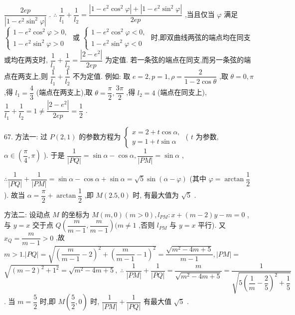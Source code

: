 $\dfrac{2ep}{\left| 1 - {e}^{2}{\sin }^{2}\varphi \right| }$ . $\therefore \;\dfrac{1}{{l}_{1}} + \dfrac{1}{{l}_{2}} = \dfrac{\left| {1 - {e}^{2}{\cos }^{2}\varphi }\right|  + \left| {1 - {e}^{2}{\sin }^{2}\varphi }\right| }{2ep}$ ,当且仅当 $\varphi$ 满足 $\left\{  \begin{array}{l} 1 - {e}^{2}{\cos }^{2}\varphi  > 0, \\  1 - {e}^{2}{\sin }^{2}\varphi  > 0 \end{array}\right.$ 或 $\left\{  \begin{array}{l} 1 - {e}^{2}{\cos }^{2}\varphi  < 0, \\  1 - {e}^{2}{\sin }^{2}\varphi  < 0 \end{array}\right.$ 时,即双曲线两弦的端点均在同支或均在两支时, $\dfrac{1}{{l}_{1}} + \dfrac{1}{{l}_{2}} = \dfrac{\left| 2 - {e}^{2}\right| }{2ep}$ 为定值. 若一条弦的端点在同支,而另一条弦的端点在两支上,则 $\dfrac{1}{{l}_{1}} + \dfrac{1}{{l}_{2}}$ 不为定值. 例如: 取 $e = 2,p = 1,\rho  = \dfrac{2}{1 - 2\cos \theta }$ ,取 $\theta  = 0,\pi$ ,得 ${l}_{1} = \dfrac{4}{3}$ (端点在两支上),取 $\theta  = \dfrac{\pi }{2},\dfrac{3\pi }{2}$ ,得 ${l}_{2} = 4$ (端点在同支上), $\dfrac{1}{{l}_{1}} + \dfrac{1}{{l}_{2}} = 1 \neq  \dfrac{\left| 2 - {e}^{2}\right| }{2ep} = \dfrac{1}{2}$ .

67. 方法一: 过 $P\left( {2,1}\right)$ 的参数方程为 $\left\{  \begin{array}{l} x = 2 + t\cos \alpha , \\  y = 1 + t\sin \alpha  \end{array}\right.$ ( $t$ 为参数, $\alpha  \in  \left( {\dfrac{\pi }{4},\pi }\right)$ ). 于是 $\dfrac{1}{\left| PQ\right| } = \sin \alpha  - \cos \alpha ,\dfrac{1}{\left| PM\right| } = \sin \alpha$ ,

$\therefore \dfrac{1}{\left| PQ\right| } + \dfrac{1}{\left| PM\right| } = \sin \alpha  - \cos \alpha  + \sin \alpha  = \sqrt{5}\sin \left( {\alpha  - \varphi }\right)$ (其中 $\varphi  = \arctan \dfrac{1}{2}$ ). 故当 $\alpha  = \dfrac{\pi }{2} + \arctan \dfrac{1}{2}$ ,即 $M\left( {{2.5},0}\right)$ 时, 有最大值为 $\sqrt{5}$ .

方法二: 设动点 $M$ 的坐标为 $M\left( {m,0}\right) \left( {m > 0}\right) ,{l}_{PM} : x + \left( {m - 2}\right) y - m = 0$ ,与 $y = x$ 交于点 $Q\left( {\dfrac{m}{m - 1},\dfrac{m}{m - 1}}\right) (m \neq  1$ ,否则 ${l}_{PM}$ 与 $y = x$ 平行). 又 ${x}_{Q} = \dfrac{m}{m - 1} > 0$ ,故 $m > 1.\left| {PQ}\right|  = \sqrt{{\left( \dfrac{m}{m - 1} - 2\right) }^{2} + {\left( \dfrac{m}{m - 1} - 1\right) }^{2}} = \dfrac{\sqrt{{m}^{2} - {4m} + 5}}{m - 1},\left| {PM}\right|  =$  $\sqrt{{\left( m - 2\right) }^{2} + {1}^{2}} = \sqrt{{m}^{2} - {4m} + 5},\;\therefore \;\dfrac{1}{\left| PM\right| } + \dfrac{1}{\left| PQ\right| } = \dfrac{m}{\sqrt{{m}^{2} - {4m} + 5}} = \dfrac{1}{\sqrt{5{\left( \dfrac{1}{m} - \dfrac{2}{5}\right) }^{2} + \dfrac{1}{5}}}$ . 当 $m = \dfrac{5}{2}$ 时,即 $M\left( {\dfrac{5}{2},0}\right)$ 时, $\dfrac{1}{\left| PM\right| } + \dfrac{1}{\left| PQ\right| }$ 有最大值 $\sqrt{5}$ .

